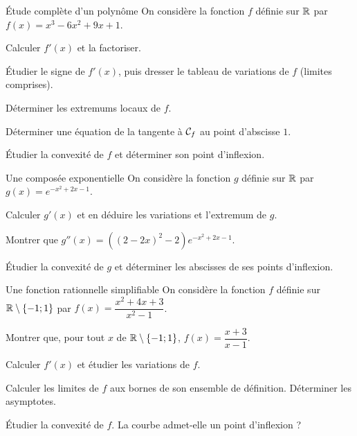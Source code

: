
\begin{exercice}[2]{Étude complète d'un polynôme}
On considère la fonction $f$ définie sur $\mathbb{R}$ par $f(x)=x^{3}-6x^{2}+9x+1$.
\begin{questions}
  \item Calculer $f'(x)$ et la factoriser.
  \item Étudier le signe de $f'(x)$, puis dresser le tableau de variations de $f$ (limites comprises).
  \item Déterminer les extremums locaux de $f$.
  \item Déterminer une équation de la tangente à $\mathcal{C}_f$ au point d'abscisse $1$.
  \item Étudier la convexité de $f$ et déterminer son point d'inflexion.
\end{questions}
\end{exercice}

\begin{exercice}[2]{Une composée exponentielle}
On considère la fonction $g$ définie sur $\mathbb{R}$ par $g(x)=e^{-x^{2}+2x-1}$.
\begin{questions}
  \item Calculer $g'(x)$ et en déduire les variations et l'extremum de $g$.
  \item Montrer que $g''(x)=\left((2-2x)^{2}-2\right)e^{-x^{2}+2x-1}$.
  \item Étudier la convexité de $g$ et déterminer les abscisses de ses points d'inflexion.
\end{questions}
\end{exercice}

\begin{exercice}[2]{Une fonction rationnelle simplifiable}
On considère la fonction $f$ définie sur $\mathbb{R}\setminus\{-1;1\}$ par $f(x)=\dfrac{x^{2}+4x+3}{x^{2}-1}$.
\begin{questions}
  \item Montrer que, pour tout $x$ de $\mathbb{R}\setminus\{-1;1\}$, $f(x)=\dfrac{x+3}{x-1}$.
  \item Calculer $f'(x)$ et étudier les variations de $f$.
  \item Calculer les limites de $f$ aux bornes de son ensemble de définition. Déterminer les asymptotes.
  \item Étudier la convexité de $f$. La courbe admet-elle un point d'inflexion ?
\end{questions}
\end{exercice}

